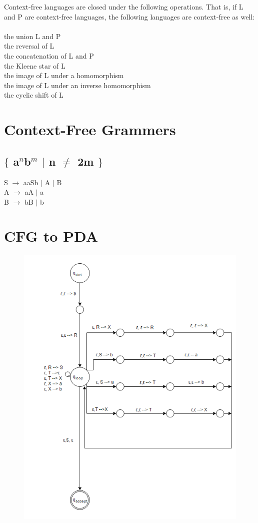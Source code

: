 \documentclass[10pt,letterpaper]{article}
\author{Brock Ellefson}
\begin{document}
Context-free languages are closed under the following operations. That is, if L and P are context-free languages, the following languages are context-free as well:
\\\\
the union  L and P\\
the reversal of L\\
the concatenation of L and P\\
the Kleene star of L\\
the image of L under a homomorphism\\
the image of L under an inverse homomorphism\\
the cyclic shift of L

\section*{Context-Free Grammers}
\subsection*{$\lbrace$ a$^{n}$b$^{m}$ $\mid$ n $\neq$ 2m $\rbrace$}
	S $\rightarrow$ aaSb $\mid$ A $\mid$ B \\
	A $\rightarrow$ aA $\mid$ a \\
	B $\rightarrow$ bB $\mid$ b
	
\section*{CFG to PDA}
	\begin{figure}[h]
		\includegraphics[scale = .2]{CFGtoPDA.png}
  		\label{fig:cfgtopda}
	\end{figure}
\end{document}
